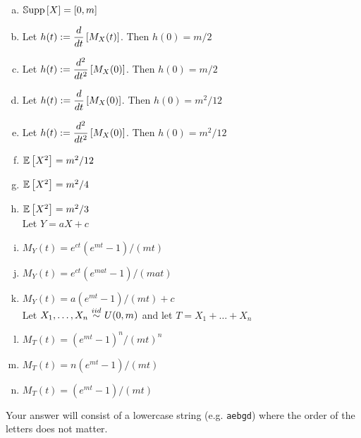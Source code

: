 \documentclass[12pt,landscape]{article}
\newcommand{\instr}{\small Your answer will consist of a lowercase string (e.g. \texttt{aebgd}) where the order of the letters does not matter. \normalsize}
\begin{document}
\vspace{-0.2cm}\benum{} 
\begin{enumerate}[(a)]
\item $\mathbb{S}\text{upp}\left[X\right] = \left[0,m\right]$

\item Let $h(t) := \displaystyle\frac{d}{dt}\left[M_X(t)\right]$. Then $h(0) = m/2$
\item Let $h(t) := \displaystyle\frac{d^2}{dt^2}\left[M_X(0)\right]$. Then $h(0)  = m/2$
\item Let $h(t) := \displaystyle\frac{d}{dt}\left[M_X(0)\right]$. Then $h(0)  = m^2/12$
\item Let $h(t) := \displaystyle\frac{d^2}{dt^2}\left[M_X(0)\right]$. Then $h(0)  = m^2/12$

\item $\mathbb{E}\left[X^2\right] = m^2/12$
\item $\mathbb{E}\left[X^2\right] = m^2/4$
\item $\mathbb{E}\left[X^2\right] = m^2/3$ \\

Let $Y = aX + c$
\item $M_Y(t) = e^{ct}(e^{mt} - 1) / (mt)$
\item $M_Y(t) = e^{ct}(e^{mat} - 1) / (mat)$
\item $M_Y(t) = a(e^{mt} - 1) / (mt) + c$ \\

Let $\Xoneton \iid U(0, m)$ and let $T = X_1 + \ldots + X_n$
\item $M_T(t) =  (e^{mt} - 1)^n / (mt)^n$
\item $M_T(t) =  n(e^{mt} - 1) / (mt)$
\item $M_T(t) =  (e^{mt} - 1) / (mt)$

\end{enumerate}
\eenum\instr\pagebreak
\end{document}
